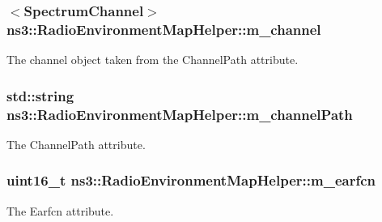 \subsubsection[{\texorpdfstring{m\+\_\+channel}{m_channel}}]{$<${\bf Spectrum\+Channel}$>$ ns3\+::\+Radio\+Environment\+Map\+Helper\+::m\+\_\+channel\hspace{0.3cm}{\ttfamily [private]}}\hypertarget{classns3_1_1RadioEnvironmentMapHelper_a38de708dbd18e8ee576c36bdb78f9fce}{}\label{classns3_1_1RadioEnvironmentMapHelper_a38de708dbd18e8ee576c36bdb78f9fce}


The channel object taken from the {\ttfamily Channel\+Path} attribute. 

\subsubsection[{\texorpdfstring{m\+\_\+channel\+Path}{m_channelPath}}]{\setlength{\rightskip}{0pt plus 5cm}std\+::string ns3\+::\+Radio\+Environment\+Map\+Helper\+::m\+\_\+channel\+Path\hspace{0.3cm}{\ttfamily [private]}}\hypertarget{classns3_1_1RadioEnvironmentMapHelper_ad059b7a091d9438c3c7539f122cd3070}{}\label{classns3_1_1RadioEnvironmentMapHelper_ad059b7a091d9438c3c7539f122cd3070}


The {\ttfamily Channel\+Path} attribute. 

\subsubsection[{\texorpdfstring{m\+\_\+earfcn}{m_earfcn}}]{\setlength{\rightskip}{0pt plus 5cm}uint16\+\_\+t ns3\+::\+Radio\+Environment\+Map\+Helper\+::m\+\_\+earfcn\hspace{0.3cm}{\ttfamily [private]}}\hypertarget{classns3_1_1RadioEnvironmentMapHelper_aa04a4e6e1f216f95e3074120101e9d95}{}\label{classns3_1_1RadioEnvironmentMapHelper_aa04a4e6e1f216f95e3074120101e9d95}


The {\ttfamily Earfcn} attribute. 

